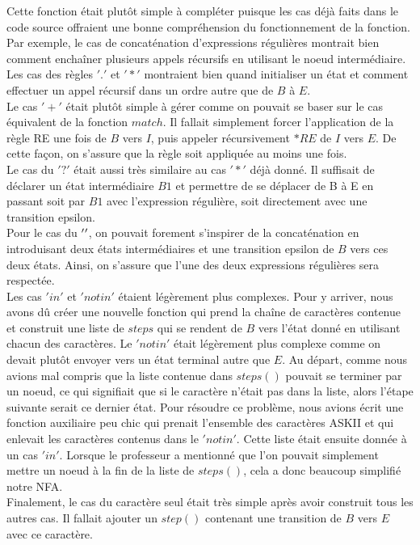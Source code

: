 \documentclass{article}
\begin{document}
    Cette fonction était plutôt simple à compléter puisque les cas déjà faits 
    dans le code source offraient une bonne compréhension du fonctionnement de
    la fonction. Par exemple, le cas de concaténation d'expressions régulières 
    montrait bien comment enchaîner plusieurs appels récursifs en utilisant 
    le noeud intermédiaire. Les cas des règles $'.'$ et $'*'$ montraient bien quand 
    initialiser un état et comment effectuer un appel récursif dans un ordre 
    autre que de $B$ à $E$.\\
    Le cas $'+'$ était plutôt simple à gérer comme on pouvait se baser sur le 
    cas équivalent de la fonction $match$. Il fallait simplement forcer 
    l'application de la règle RE une fois de $B$ vers $I$, puis appeler 
    récursivement $*RE$ de $I$ vers $E$. De cette façon, on s'assure que la règle 
    soit appliquée au moins une fois. \\
    Le cas du $'?'$ était aussi très similaire au cas $'*'$ déjà donné. Il 
    suffisait de déclarer un état intermédiaire $B1$ et permettre de se 
    déplacer de B à E en passant soit par $B1$ avec l'expression régulière, 
    soit directement avec une transition epsilon. \\
    Pour le cas du $'\/'$, on pouvait forement s'inspirer de la concaténation 
    en introduisant deux états intermédiaires et une transition epsilon de 
    $B$ vers ces deux états. Ainsi, on s'assure que l'une des deux expressions 
    régulières sera respectée. \\
    Les cas $'in'$ et $'notin'$ étaient légèrement plus complexes. Pour y arriver, 
    nous avons dû créer une nouvelle fonction qui prend la chaîne de 
    caractères contenue et construit une liste de $steps$ qui se rendent de $B$ 
    vers l'état donné en utilisant chacun des caractères. Le $'notin'$ était 
    légèrement plus complexe comme on devait plutôt envoyer vers un état 
    terminal autre que $E$. Au départ, comme nous avions mal compris que la liste 
    contenue dans $steps()$ pouvait se terminer par un noeud, ce qui signifiait 
    que si le caractère n'était pas dans la liste, alors l'étape suivante serait 
    ce dernier état. Pour résoudre ce problème, nous avions écrit une fonction 
    auxiliaire peu chic qui prenait l'ensemble des caractères ASKII et qui 
    enlevait les caractères contenus dans le $'notin'$. Cette liste était ensuite 
    donnée à un cas $'in'$. Lorsque le professeur a mentionné que l'on pouvait 
    simplement mettre un noeud à la fin de la liste de $steps()$, cela a donc 
    beaucoup simplifié notre NFA.\\
    Finalement, le cas du caractère seul était très simple après avoir 
    construit tous les autres cas. Il fallait ajouter un $step()$ contenant 
    une transition de $B$ vers $E$ avec ce caractère.
    
\end{document}
